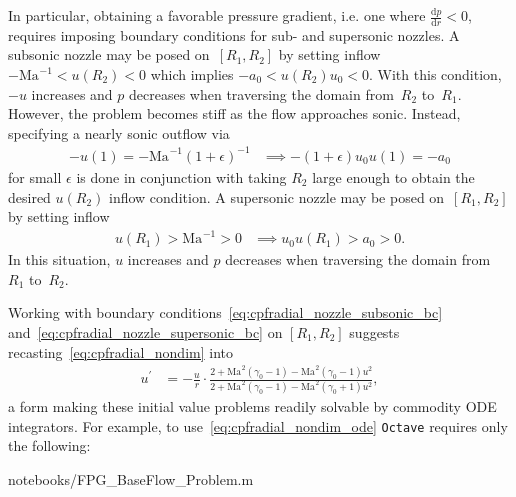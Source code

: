 \documentclass[letterpaper,11pt,nointlimits,reqno]{amsart}
\newcommand{\Mach}[1][]{\ensuremath{\mbox{Ma}_{#1}}}
\begin{document}
In particular, obtaining a favorable pressure gradient, i.e. one where
$\frac{\mathrm{d}p}{\mathrm{d}r} < 0$, requires imposing boundary conditions
for sub- and supersonic nozzles.
%
A subsonic nozzle may be posed on~$\left[R_{1}, R_{2}\right]$ by setting
inflow
    $-\Mach^{-1} < u(R_{2}) < 0$
    which implies
    $-a_0 < u(R_{2}) u_0 < 0$.
With this condition, $-u$ increases and $p$ decreases when traversing the
domain from~$R_{2}$ to~$R_{1}$.  However, the problem becomes stiff as the flow
approaches sonic.  Instead, specifying a nearly sonic outflow via
\begin{align}
    -u(1) = -\Mach^{-1} \left(1 + \epsilon\right)^{-1}
    &\implies
    -\left(1 + \epsilon \right) u_0 u(1) = - a_0
\label{eq:cpfradial_nozzle_subsonic_bc}
\end{align}
for small $\epsilon$ is done in conjunction with taking $R_{2}$ large enough to
obtain the desired $u(R_{2})$ inflow condition.
%
A supersonic nozzle may be posed on~$\left[R_{1}, R_{2}\right]$ by setting
inflow
\begin{align}
    u\left(R_{1}\right) > \Mach^{-1} > 0
    &\implies
    u_0 u\left(R_{1}\right) > a_0 > 0
\label{eq:cpfradial_nozzle_supersonic_bc}
.
\end{align}
In this situation, $u$ increases and $p$ decreases when traversing the domain
from~$R_{1}$ to~$R_{2}$.

Working with boundary conditions~\eqref{eq:cpfradial_nozzle_subsonic_bc}
and~\eqref{eq:cpfradial_nozzle_supersonic_bc} on $\left[R_1, R_2\right]$
suggests recasting~\eqref{eq:cpfradial_nondim} into
\begin{align}
   u^\prime
   &=
   -\frac{u}{r}
   \cdot
   \frac{
      2
    + \Mach^2\left(\gamma_0-1\right)
    - \Mach^2\left(\gamma_0-1\right) u^2
   }{
      2
    + \Mach^2\left(\gamma_0-1\right)
    - \Mach^2\left(\gamma_0+1\right) u^2
   }
\label{eq:cpfradial_nondim_ode}
,
\end{align}
a form making these initial value problems readily solvable by commodity ODE
integrators.  For example, to use~\eqref{eq:cpfradial_nondim_ode}
\texttt{Octave}\citep{Eaton2008GNU} requires only the following:

                {notebooks/FPG_BaseFlow_Problem.m}

\newcommand*{\doi}[1]{\href{http://dx.doi.org/\detokenize{#1}}{doi: #1}}


\end{document}
